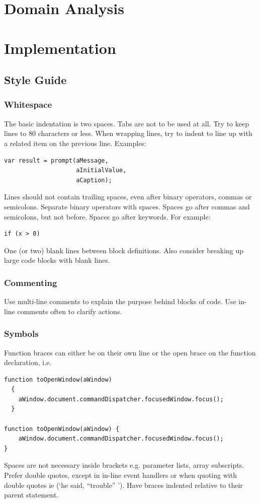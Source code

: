 \documentclass[letterpaper,12pt]{article}
\begin{document}
\section{Domain Analysis}
\section{Implementation}
\subsection{Style Guide}
\subsubsection{Whitespace}
The basic indentation is two spaces. Tabs are not to be used at all.
Try to keep lines to 80 characters or less. When wrapping lines, try to indent to line up with a related item on the previous line. Examples: 
\begin{verbatim}
var result = prompt(aMessage,
                    aInitialValue,
                    aCaption);
\end{verbatim}
Lines should not contain trailing spaces, even after binary operators, commas or semicolons.
Separate binary operators with spaces.
Spaces go after commas and semicolons, but not before.
Spaces go after keywords. For example:
\begin{verbatim}
if (x > 0)
\end{verbatim}
One (or two) blank lines between block definitions. Also consider breaking up large code blocks with blank lines.

\subsubsection{Commenting}
Use multi-line comments to explain the purpose behind blocks of code.
Use in-line comments often to clarify actions.

\subsubsection{Symbols}
Function braces can either be on their own line or the open brace on the function declaration, i.e.

\begin{verbatim}
function toOpenWindow(aWindow)
  {
    aWindow.document.commandDispatcher.focusedWindow.focus();  
  }

function toOpenWindow(aWindow) {
    aWindow.document.commandDispatcher.focusedWindow.focus();  
}
\end{verbatim}
Spaces are not necessary inside brackets e.g. parameter lists, array subscripts.
Prefer double quotes, except in in-line event handlers or when quoting with double quotes ie (‘he said, “trouble” ’).
Have braces indented relative to their parent statement.
\end{document}
